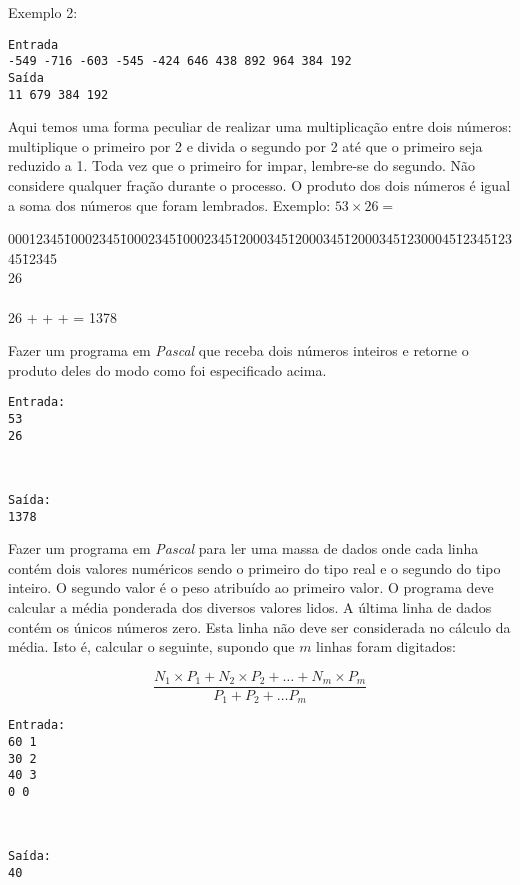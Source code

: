 Exemplo 2:
\begin{verbatim}
Entrada
-549 -716 -603 -545 -424 646 438 892 964 384 192
Saída
11 679 384 192
\end{verbatim}

\item  Aqui temos uma forma peculiar de realizar uma multiplicação entre
dois números: multiplique o primeiro por 2 e divida o segundo por 2
até que o primeiro seja reduzido a 1. Toda vez que o primeiro for
impar, lembre-se do segundo. Não considere qualquer fração durante
o processo. O produto dos dois números é igual a soma dos números
que foram lembrados. Exemplo: $53 \times 26 =$

\begin {tabbing}
00012345\=10002345\=10002345\=10002345\=12000345\=12000345\=12000345\=12300045\=12345\=12345\=12345       \\
26      \\
\\
26 + \>  + \>  +  = 1378
\end {tabbing}

Fazer um programa em \emph{Pascal}
que receba dois números inteiros e retorne o produto deles
do modo como foi especificado acima.

\begin{minipage}{5cm}
\begin{verbatim}
Entrada:
53
26
\end{verbatim}
\end{minipage} \
\begin{minipage}{5cm}
\begin{verbatim}
Saída:
1378
\end{verbatim}
\end{minipage}

\item Fazer um programa em \emph{Pascal} para
    ler  uma massa de dados onde  cada linha contém dois  valores numéricos
    sendo o primeiro do tipo real e o segundo do tipo inteiro. O segundo
    valor é o peso atribuído ao primeiro valor. O
    programa deve calcular a média ponderada dos diversos valores lidos.
    A última
    linha de  dados contém os  únicos números zero.  Esta linha não  deve ser
    considerada no cálculo da média. Isto é, calcular o seguinte, supondo
    que $m$ linhas foram digitados:

\[
\frac{N_1 \times P_1 + N_2 \times P_2 + \ldots + N_m \times P_m}{P_1 + 
 P_2 + \ldots P_m}
\]
\begin{minipage}{5cm}
\begin{verbatim}
Entrada:
60 1
30 2
40 3
0 0
\end{verbatim}
\end{minipage} \
\begin{minipage}{5cm}
\begin{verbatim}
Saída:
40
\end{verbatim}
\end{minipage}


